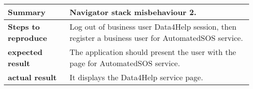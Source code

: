 \documentclass[../main.tex]{subfiles}
\begin{document}
    \vspace*{3cm}
    \begin{center}
		\begin{tabular}{p{3cm}p{8.28cm}}
			\hline
			\textbf{Summary} & Navigator stack misbehaviour 2. \\
			\hline
			\textbf{Steps to    reproduce} & Log out of business user Data4Help session, then register a business user for AutomatedSOS service. \\
			\hline
			\textbf{expected result} &  The application should present the user with the page for AutomatedSOS service. \\
			\hline
			\textbf{actual result} &  It displays the Data4Help service page.\\
		\end{tabular}
	\end{center}
    \vspace*{3cm}
\end{document}
